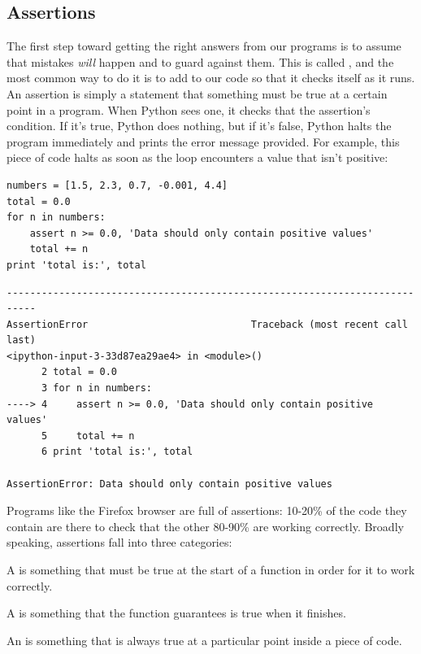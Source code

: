 \documentclass{book}
\begin{document}
\subsection{Assertions}

The first step toward getting the right answers from our programs is to
assume that mistakes \emph{will} happen and to guard against them. This
is called , and
the most common way to do it is to add
 to our code so that it checks itself
as it runs. An assertion is simply a statement that something must be
true at a certain point in a program. When Python sees one, it checks
that the assertion's condition. If it's true, Python does nothing, but
if it's false, Python halts the program immediately and prints the error
message provided. For example, this piece of code halts as soon as the
loop encounters a value that isn't positive:

\begin{verbatim}
numbers = [1.5, 2.3, 0.7, -0.001, 4.4]
total = 0.0
for n in numbers:
    assert n >= 0.0, 'Data should only contain positive values'
    total += n
print 'total is:', total
\end{verbatim}

\begin{verbatim}
---------------------------------------------------------------------------
AssertionError                            Traceback (most recent call last)
<ipython-input-3-33d87ea29ae4> in <module>()
      2 total = 0.0
      3 for n in numbers:
----> 4     assert n >= 0.0, 'Data should only contain positive values'
      5     total += n
      6 print 'total is:', total

AssertionError: Data should only contain positive values
\end{verbatim}

Programs like the Firefox browser are full of assertions: 10-20\% of the
code they contain are there to check that the other 80-90\% are working
correctly. Broadly speaking, assertions fall into three categories:

\begin{swcitemize}
\item
  A  is something that must be
  true at the start of a function in order for it to work correctly.
\item
  A  is something that the
  function guarantees is true when it finishes.
\item
  An  is something that is always true
  at a particular point inside a piece of code.
\end{swcitemize}
\end{document}
